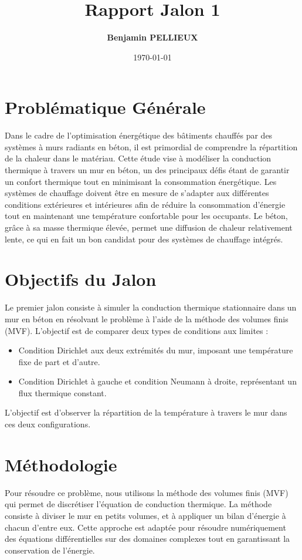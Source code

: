 \documentclass[a4paper,11pt]{article}
\title{Rapport Jalon 1}
\author{\textbf{Benjamin PELLIEUX}}
\date{\today}
\begin{document}
\maketitle

\section{Problématique Générale}
Dans le cadre de l'optimisation énergétique des bâtiments chauffés par des systèmes à murs radiants en béton, il est primordial de comprendre la répartition de la chaleur dans le matériau. Cette étude vise à modéliser la conduction thermique à travers un mur en béton, un des principaux défis étant de garantir un confort thermique tout en minimisant la consommation énergétique. Les systèmes de chauffage doivent être en mesure de s'adapter aux différentes conditions extérieures et intérieures afin de réduire la consommation d'énergie tout en maintenant une température confortable pour les occupants. Le béton, grâce à sa masse thermique élevée, permet une diffusion de chaleur relativement lente, ce qui en fait un bon candidat pour des systèmes de chauffage intégrés.

\section{Objectifs du Jalon}
Le premier jalon consiste à simuler la conduction thermique stationnaire dans un mur en béton en résolvant le problème à l'aide de la méthode des volumes finis (MVF). L'objectif est de comparer deux types de conditions aux limites :
\begin{itemize}
    \item Condition Dirichlet aux deux extrémités du mur, imposant une température fixe de part et d'autre.
    \item Condition Dirichlet à gauche et condition Neumann à droite, représentant un flux thermique constant.
\end{itemize}
L'objectif est d'observer la répartition de la température à travers le mur dans ces deux configurations.

\section{Méthodologie}
Pour résoudre ce problème, nous utilisons la méthode des volumes finis (MVF) qui permet de discrétiser l'équation de conduction thermique. La méthode consiste à diviser le mur en petits volumes, et à appliquer un bilan d'énergie à chacun d'entre eux. Cette approche est adaptée pour résoudre numériquement des équations différentielles sur des domaines complexes tout en garantissant la conservation de l'énergie.
\end{document}
